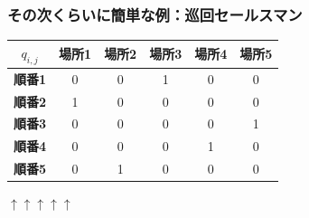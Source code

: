 \begin{frame}
  \frametitle{その次くらいに簡単な例：巡回セールスマン}

  \begin{table}
    \centering
    \begin{tabular}{c|c c c c c}
        \textbf{$q_{i,j}$} & \textbf{場所1} & \textbf{場所2} & \textbf{場所3} & \textbf{場所4} & \textbf{場所5} \\
        \hline
        \textbf{順番1} &{\cellcolor{blue!50}} 0 & 0 &{\cellcolor{blue!50}} 1 & 0 &{\cellcolor{blue!50}} 0  \\
        \textbf{順番2} &{\cellcolor{blue!50}} 1 & 0 &{\cellcolor{blue!50}} 0 & 0 &{\cellcolor{blue!50}} 0  \\
        \textbf{順番3} &{\cellcolor{blue!50}} 0 & 0 &{\cellcolor{blue!50}} 0 & 0 &{\cellcolor{blue!50}} 1  \\
        \textbf{順番4} &{\cellcolor{blue!50}} 0 & 0 &{\cellcolor{blue!50}} 0 & 1 &{\cellcolor{blue!50}} 0  \\
        \textbf{順番5} &{\cellcolor{blue!50}} 0 & 1 &{\cellcolor{blue!50}} 0 & 0 &{\cellcolor{blue!50}} 0  \\
    \end{tabular}
  \end{table}
  \hspace{4.65cm}$\uparrow$\hspace{1.3cm}$\uparrow$\hspace{1.3cm}$\uparrow$\hspace{1.3cm}$\uparrow$\hspace{1.3cm}$\uparrow$\\
\end{frame}

